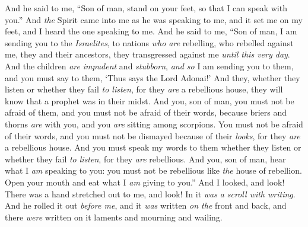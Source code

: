 \begin{biblechapter} %
 And he said to me, “Son of man, stand on your feet, so that I can speak with you.”
\verse And \textit{the} Spirit came into me as he was speaking to me, and it set me on my feet, and I heard the one speaking to me.
\verse And he said to me, “Son of man, I am sending you to the \textit{Israelites}, to nations \textit{who are} rebelling, who rebelled against me, they and their ancestors, they transgressed against me \textit{until this very day}.
\verse And the children \textit{are} \textit{impudent} and \textit{stubborn}, \textit{and so} I am sending you to them, and you must say to them, ‘Thus says the Lord Adonai!’
\verse And they, whether they listen or whether they fail \textit{to listen}, for they \textit{are} a rebellious house, they will know that a prophet was in their midst.
\verse And you, son of man, you must not be afraid of them, and you must not be afraid of their words, because briers and thorns \textit{are} with you, and you \textit{are} sitting among scorpions. You must not be afraid of their words, and you must not be dismayed because of their \textit{looks}, for they \textit{are} a rebellious house.
\verse And you must speak my words to them whether they listen or whether they fail \textit{to listen}, for they \textit{are} rebellious.
\verse And you, son of man, hear what I \textit{am} speaking to you: you must not be rebellious like \textit{the} house of rebellion. Open your mouth and eat what I \textit{am} giving to you.”
\verse And I looked, and look! There was a hand stretched out to me, and look! In it \textit{was} \textit{a scroll with writing}.
\verse And he rolled it out \textit{before me}, and it \textit{was} written \textit{on the} front and back, and there \textit{were} written on it laments and mourning and wailing.
\end{biblechapter}

